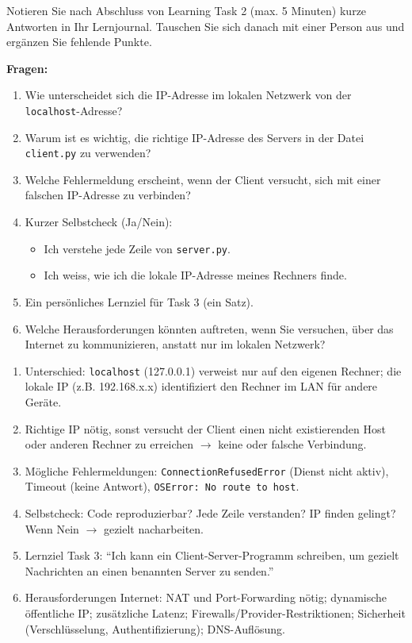 \begin{myexercise}[Reflexionsfragen]
    Notieren Sie nach Abschluss von Learning Task 2 (max. 5 Minuten) kurze Antworten in Ihr Lernjournal. Tauschen Sie sich danach mit einer Person aus und ergänzen Sie fehlende Punkte.

    \textbf{Fragen:}
    \begin{enumerate}
        \item Wie unterscheidet sich die \gls{IP}-Adresse im lokalen Netzwerk von der \texttt{localhost}-Adresse?
        \item Warum ist es wichtig, die richtige \gls{IP}-Adresse des Servers in der Datei \texttt{client.py} zu verwenden?
        \item Welche Fehlermeldung erscheint, wenn der Client versucht, sich mit einer falschen \gls{IP}-Adresse zu verbinden?
        \item Kurzer Selbstcheck (Ja/Nein):
              \begin{itemize}
                  \item Ich verstehe jede Zeile von \texttt{server.py}.
                  \item Ich weiss, wie ich die lokale IP-Adresse meines Rechners finde.
              \end{itemize}
        \item Ein persönliches Lernziel für Task 3 (ein Satz).
        \item Welche Herausforderungen könnten auftreten, wenn Sie versuchen, über das Internet zu kommunizieren, anstatt nur im lokalen Netzwerk?
    \end{enumerate}
    \begin{myanswer}
        \begin{enumerate}
            \item Unterschied: \texttt{localhost} (127.0.0.1) verweist nur auf den eigenen Rechner; die lokale IP (z.B. 192.168.x.x) identifiziert den Rechner im LAN für andere Geräte.
            \item Richtige \gls{IP} nötig, sonst versucht der Client einen nicht existierenden Host oder anderen Rechner zu erreichen $\rightarrow$ keine oder falsche Verbindung.
            \item Mögliche Fehlermeldungen: \texttt{ConnectionRefusedError} (Dienst nicht aktiv), Timeout (keine Antwort), \texttt{OSError: No route to host}.
            \item Selbstcheck: Code reproduzierbar? Jede Zeile verstanden? IP finden gelingt? Wenn Nein $\rightarrow$ gezielt nacharbeiten.
            \item Lernziel Task 3: \enquote{Ich kann ein Client-Server-Programm schreiben, um gezielt Nachrichten an einen benannten Server zu senden.}
            \item Herausforderungen Internet: NAT und Port-Forwarding nötig; dynamische öffentliche IP; zusätzliche Latenz; Firewalls/Provider-Restriktionen; Sicherheit (Verschlüsselung, Authentifizierung); DNS-Auflösung.
        \end{enumerate}
    \end{myanswer}

\end{myexercise}
